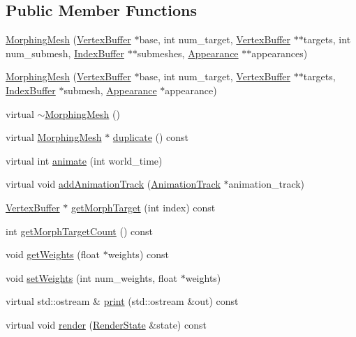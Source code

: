 \subsection*{Public Member Functions}
\begin{CompactItemize}
\item 
\hyperlink{classm3g_1_1MorphingMesh_211192cdba0b1d136977403ba4ed0d0c}{MorphingMesh} (\hyperlink{classm3g_1_1VertexBuffer}{VertexBuffer} $\ast$base, int num\_\-target, \hyperlink{classm3g_1_1VertexBuffer}{VertexBuffer} $\ast$$\ast$targets, int num\_\-submesh, \hyperlink{classm3g_1_1IndexBuffer}{IndexBuffer} $\ast$$\ast$submeshes, \hyperlink{classm3g_1_1Appearance}{Appearance} $\ast$$\ast$appearances)
\item 
\hyperlink{classm3g_1_1MorphingMesh_4a2347ee9c813fa1a6eef998f37bf6d5}{MorphingMesh} (\hyperlink{classm3g_1_1VertexBuffer}{VertexBuffer} $\ast$base, int num\_\-target, \hyperlink{classm3g_1_1VertexBuffer}{VertexBuffer} $\ast$$\ast$targets, \hyperlink{classm3g_1_1IndexBuffer}{IndexBuffer} $\ast$submesh, \hyperlink{classm3g_1_1Appearance}{Appearance} $\ast$appearance)
\item 
virtual \hyperlink{classm3g_1_1MorphingMesh_cdafafba64a0167f28f3b66ac4b9d7d6}{$\sim$MorphingMesh} ()
\item 
virtual \hyperlink{classm3g_1_1MorphingMesh}{MorphingMesh} $\ast$ \hyperlink{classm3g_1_1MorphingMesh_7e7b2c3c4c988c6341a5e249bd468f57}{duplicate} () const 
\item 
virtual int \hyperlink{classm3g_1_1MorphingMesh_8aad1ceab4c2a03609c8a42324ce484d}{animate} (int world\_\-time)
\item 
virtual void \hyperlink{classm3g_1_1MorphingMesh_415c0b110f95410ded9b85e5d99a496b}{addAnimationTrack} (\hyperlink{classm3g_1_1AnimationTrack}{AnimationTrack} $\ast$animation\_\-track)
\item 
\hyperlink{classm3g_1_1VertexBuffer}{VertexBuffer} $\ast$ \hyperlink{classm3g_1_1MorphingMesh_44766cc08b595f074d0d698c75f544b4}{getMorphTarget} (int index) const 
\item 
int \hyperlink{classm3g_1_1MorphingMesh_620d9684124201f738a28c7c39641541}{getMorphTargetCount} () const 
\item 
void \hyperlink{classm3g_1_1MorphingMesh_80cef3b2c5e4881567409829de224e46}{getWeights} (float $\ast$weights) const 
\item 
void \hyperlink{classm3g_1_1MorphingMesh_b97015e8aeed76a33582eb11d06e322b}{setWeights} (int num\_\-weights, float $\ast$weights)
\item 
virtual std::ostream \& \hyperlink{classm3g_1_1MorphingMesh_6fea17fa1532df3794f8cb39cb4f911f}{print} (std::ostream \&out) const 
\item 
virtual void \hyperlink{classm3g_1_1MorphingMesh_8babc8a79b78615da51161e94029eea9}{render} (\hyperlink{structm3g_1_1RenderState}{RenderState} \&state) const 
\end{CompactItemize}
